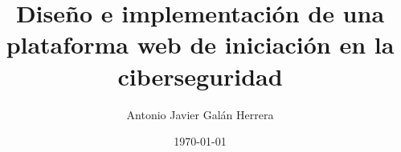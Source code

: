\title[Plataforma de iniciación en la ciberseguridad]
{Diseño e implementación de una plataforma web de iniciación en la ciberseguridad}

\author{Antonio Javier Galán Herrera}


\date{\today}

